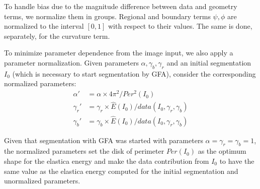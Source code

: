\documentclass[review]{siamart220329}
\begin{document}
%
%
To handle bias due to the magnitude difference between data and geometry terms,
we normalize them in groups. Regional and boundary terms $\psi,\phi$ are
normalized to the interval $[0,1]$ with respect to their values. The same is
done, separately, for the curvature term.

To minimize parameter dependence from the image input, we also apply a parameter
normalization. Given parameters $\alpha, \gamma_b, \gamma_r$ and an initial
segmentation $I_0$ (which is necessary to start segmentation by GFA), consider
the corresponding normalized parameters:
%
%
\begin{align*}
    \alpha' & = \alpha \times 4\pi^2/Per^2(I_0) \\
	\gamma_r' & = \gamma_r \times \hat{E}(I_0)/data(I_0,\gamma_r,\gamma_b) \\	
	\gamma_b' & = \gamma_b \times \hat{E}(I_0)/data(I_0,\gamma_r,\gamma_b)		
\end{align*}

Given that segmentation with GFA was started with parameters
$\alpha=\gamma_r=\gamma_b=1$, the normalized parameters set the disk of
perimeter $Per(I_0)$ as the optimum shape for the elastica energy and make the
data contribution from $I_0$ to have the same value as the elastica energy
computed for the initial segmentation and unormalized parameters.
%
%
\end{document}
